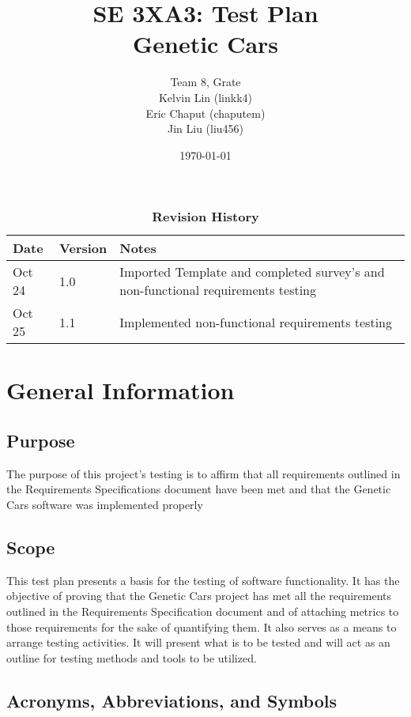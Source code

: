 \documentclass[12pt, titlepage]{article}
\title{SE 3XA3: Test Plan\\Genetic Cars}
\author{Team 8, Grate
		\\ Kelvin Lin (linkk4)
		\\ Eric Chaput (chaputem)
		\\ Jin Liu (liu456)
}
\date{\today}
\begin{document}
\maketitle

\tableofcontents
\listoftables
\listoffigures

\begin{table}[bp]
\caption{\bf Revision History}
\begin{tabularx}{\textwidth}{p{3cm}p{2cm}X}
\toprule {\bf Date} & {\bf Version} & {\bf Notes}\\
\midrule
Oct 24 & 1.0 & Imported Template and completed survey's and non-functional requirements  testing\\
Oct 25 & 1.1 & Implemented non-functional requirements testing\\
\bottomrule
\end{tabularx}
\end{table}

\newpage


\section{General Information}

\subsection{Purpose}

The purpose of this project's testing is to affirm that all requirements outlined in the Requirements Specifications document have been met and that the Genetic Cars software was implemented properly

\subsection{Scope}

This test plan presents a basis for the testing of software functionality. It has the objective of proving that the Genetic Cars project has met all the requirements outlined in the Requirements Specification document and of attaching metrics to those requirements for the sake of quantifying them. It also serves as a means to arrange testing activities. It will present what is to be tested and will act as an outline for testing methods and tools to be utilized.

\subsection{Acronyms, Abbreviations, and Symbols}
	
\end{document}
